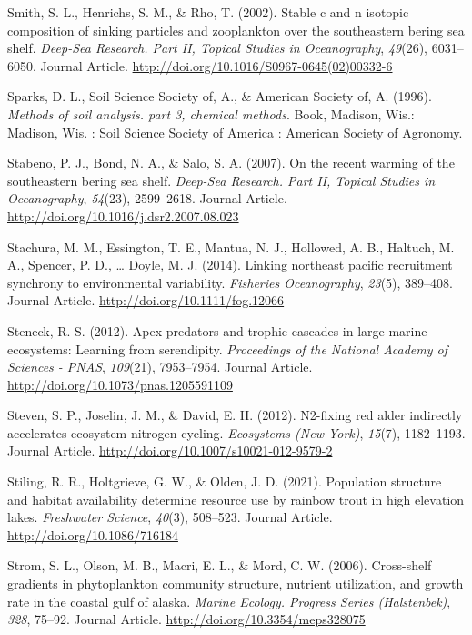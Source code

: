 \documentclass [11pt, proquest] {uwthesis}[2015/03/03]
\begin{document}
\hypertarget{ref-Smith2002}{}
Smith, S. L., Henrichs, S. M., \& Rho, T. (2002). Stable c and n
isotopic composition of sinking particles and zooplankton over the
southeastern bering sea shelf. \emph{Deep-Sea Research. Part II, Topical
Studies in Oceanography}, \emph{49}(26), 6031--6050. Journal Article.
\url{http://doi.org/10.1016/S0967-0645(02)00332-6}

\hypertarget{ref-Sparks1996}{}
Sparks, D. L., Soil Science Society of, A., \& American Society of, A.
(1996). \emph{Methods of soil analysis. part 3, chemical methods}. Book,
Madison, Wis.: Madison, Wis. : Soil Science Society of America :
American Society of Agronomy.

\hypertarget{ref-Stabeno2007}{}
Stabeno, P. J., Bond, N. A., \& Salo, S. A. (2007). On the recent
warming of the southeastern bering sea shelf. \emph{Deep-Sea Research.
Part II, Topical Studies in Oceanography}, \emph{54}(23), 2599--2618.
Journal Article. \url{http://doi.org/10.1016/j.dsr2.2007.08.023}

\hypertarget{ref-Stachura2014}{}
Stachura, M. M., Essington, T. E., Mantua, N. J., Hollowed, A. B.,
Haltuch, M. A., Spencer, P. D., \ldots{} Doyle, M. J. (2014). Linking
northeast pacific recruitment synchrony to environmental variability.
\emph{Fisheries Oceanography}, \emph{23}(5), 389--408. Journal Article.
\url{http://doi.org/10.1111/fog.12066}

\hypertarget{ref-Steneck2012}{}
Steneck, R. S. (2012). Apex predators and trophic cascades in large
marine ecosystems: Learning from serendipity. \emph{Proceedings of the
National Academy of Sciences - PNAS}, \emph{109}(21), 7953--7954.
Journal Article. \url{http://doi.org/10.1073/pnas.1205591109}

\hypertarget{ref-Perakis2012}{}
Steven, S. P., Joselin, J. M., \& David, E. H. (2012). N2-fixing red
alder indirectly accelerates ecosystem nitrogen cycling.
\emph{Ecosystems (New York)}, \emph{15}(7), 1182--1193. Journal Article.
\url{http://doi.org/10.1007/s10021-012-9579-2}

\hypertarget{ref-Stiling2021}{}
Stiling, R. R., Holtgrieve, G. W., \& Olden, J. D. (2021). Population
structure and habitat availability determine resource use by rainbow
trout in high elevation lakes. \emph{Freshwater Science}, \emph{40}(3),
508--523. Journal Article. \url{http://doi.org/10.1086/716184}

\hypertarget{ref-Strom2006}{}
Strom, S. L., Olson, M. B., Macri, E. L., \& Mord, C. W. (2006).
Cross-shelf gradients in phytoplankton community structure, nutrient
utilization, and growth rate in the coastal gulf of alaska. \emph{Marine
Ecology. Progress Series (Halstenbek)}, \emph{328}, 75--92. Journal
Article. \url{http://doi.org/10.3354/meps328075}
\end{document}
